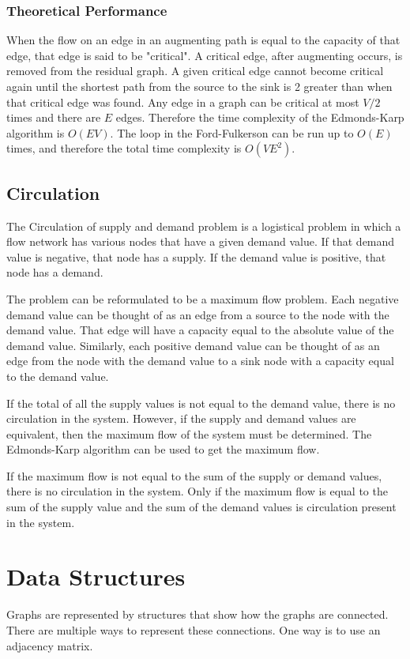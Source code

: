 \documentclass[conference]{IEEEtran}
\begin{document}
\subsubsection{Theoretical Performance} %
When the flow on an edge in an augmenting path is equal to the capacity of 
that edge, that edge is said to be "critical". A critical edge, after augmenting
occurs, is removed from the residual graph. A given critical edge cannot become
critical again until the shortest path from the source to the sink is 2 greater 
than when that critical edge was found. Any edge in a graph can be critical
at most $V/2$ times and there are $E$ edges. Therefore the time complexity of 
the Edmonds-Karp algorithm is $O(EV)$. The loop in the Ford-Fulkerson can be run
up to $O(E)$ times, and therefore the total time complexity is $O(VE^2)$.

\subsection{Circulation}
The Circulation of supply and demand problem is a logistical problem in 
which a flow network has various nodes that have a given demand value. 
If that demand value is negative, that node has a supply. If the demand
value is positive, that node has a demand.

The problem can be reformulated to be a maximum flow problem. Each negative 
demand value can be thought of as an edge from a source to the node with the
demand value. That edge will have a capacity equal to the absolute value of 
the demand value. Similarly, each positive demand value can be thought of as
an edge from the node with the demand value to a sink node with a capacity 
equal to the demand value. 

If the total of all the supply values is not equal to the demand value, there 
is no circulation in the system. However, if the supply and demand values are 
equivalent, then the maximum flow of the system must be determined. The Edmonds-Karp
algorithm can be used to get the maximum flow. 

If the maximum flow is not equal to the sum of the supply or demand values, there is no
circulation in the system. Only if the maximum flow is equal to the sum of the supply value 
and the sum of the demand values is circulation present in the system. 

\section{Data Structures}
Graphs are represented by structures that show how the graphs are connected. There are 
multiple ways to represent these connections. One way is to use an adjacency matrix.
\end{document}

